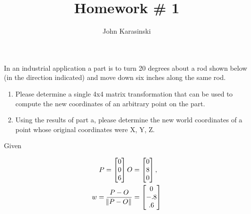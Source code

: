 \documentclass[onecolumn,10pt]{jhwhw}
\author{John Karasinski}
\title{Homework \# 1}
\begin{document}

\problem{}
In an industrial application a part is to turn 20 degrees about a rod shown below (in the direction indicated) and move down six inches along the same rod.
\begin{enumerate}
    \item Please determine a single 4x4 matrix transformation that can be used to compute the new coordinates of an arbitrary point on the part.
    \item Using the results of part a, please determine the new world coordinates of a point whose original coordinates were X, Y, Z.
\end{enumerate}

Given


\begin{align*}
P = 
\begin{bmatrix*}[c]
0 \\
0 \\
6
\end{bmatrix*}
O &=
\begin{bmatrix*}[c]
0 \\
8 \\
0
\end{bmatrix*},\\
w = \dfrac{P - O}{\norm{P - O}} &=
\begin{bmatrix*}[c]
0 \\
-.8 \\
.6
\end{bmatrix*}
\end{align*}


\end{document}
